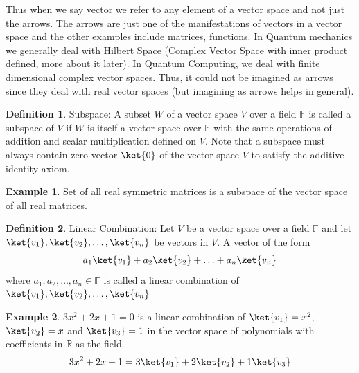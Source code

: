 \documentclass[12pt, oneside]{book}
\theoremstyle{definition}
\newtheorem{definition}{Definition}[section]
\theoremstyle{definition}
\newtheorem{example}{Example}[section]
\theoremstyle{remark}
\begin{document}
Thus when we say vector we refer to any element of a vector space and not just the arrows. The arrows are just one of the manifestations of vectors in a vector space and the other
examples include matrices, functions. In Quantum mechanics we generally deal with Hilbert Space (Complex Vector Space with inner product defined, more about it later). 
In Quantum Computing, we deal with finite dimensional complex vector spaces. Thus, it could not be imagined as arrows since they deal with real vector spaces (but imagining as arrows helps in general).

\begin{definition}
    Subspace: A subset $W$ of a vector space $V$ over a field $\mathbb{F}$ is called a subspace of $V$ if $W$ is itself a vector space over $\mathbb{F}$
    with the same operations of addition and scalar multiplication defined on $V$.
    Note that a subspace must always contain zero vector $\ket{0}$ of the vector space $V$ to satisfy the additive identity axiom.
\end{definition}

\begin{example}
    Set of all real symmetric matrices is a subspace of the vector space of all real matrices.
\end{example}

\begin{definition}
    Linear Combination: Let $V$ be a vector space over a field $\mathbb{F}$ and let $\ket{v_1},\ket{v_2},\ldots,\ket{v_n}$ be vectors in $V$. A vector of the form
    \begin{equation}
        a_1\ket{v_1}+a_2\ket{v_2}+\ldots+a_n\ket{v_n}
    \end{equation}
    where $a_1,a_2,\ldots,a_n\in\mathbb{F}$ is called a linear combination of $\ket{v_1},\ket{v_2},\ldots,\ket{v_n}$
\end{definition}

\begin{example}
    $3x^2+2x+1=0$ is a linear combination of $\ket{v_1}=x^2$, $\ket{v_2}=x$ and $\ket{v_3}=1$ in the vector space of polynomials with
    coefficients in $\mathbb{R}$ as the field.
    \[
        3x^2+2x+1=3\ket{v_1}+2\ket{v_2}+1\ket{v_3}
    \]
\end{example}
\end{document}
